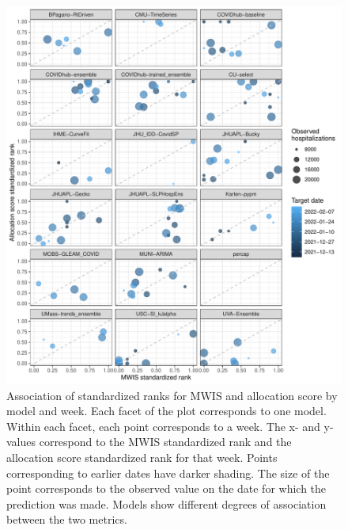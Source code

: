 \documentclass{article}\usepackage[]{graphicx}\usepackage[]{xcolor}
\makeatletter
\def\maxwidth{ %
  \ifdim\Gin@nat@width>\linewidth
    \linewidth
  \else
    \Gin@nat@width
  \fi
}
\newenvironment{knitrout}{}{} %
\makeatother
\begin{document}
\begin{knitrout}
\color{fgcolor}\begin{figure}
\includegraphics[width=\maxwidth]{figure/metrics-correlation-1} \caption[Association of standardized ranks for MWIS and allocation score by model and week]{Association of standardized ranks for MWIS and allocation score by model and week. Each facet of the plot corresponds to one model. Within each facet, each point corresponds to a week. The x- and y-values correspond to the MWIS standardized rank and the allocation score standardized rank for that week. Points corresponding to earlier dates have darker shading. The size of the point corresponds to the observed value on the date for which the prediction was made. Models show different degrees of association between the two metrics.}\label{fig:metrics-correlation}
\end{figure}

\end{knitrout}
\end{document}
